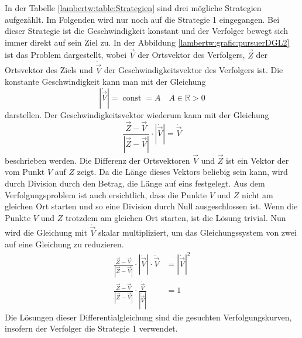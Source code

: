 In der Tabelle \eqref{lambertw:table:Strategien} sind drei mögliche Strategien aufgezählt.
Im Folgenden wird nur noch auf die Strategie 1 eingegangen.
Bei dieser Strategie ist die Geschwindigkeit konstant und der Verfolger bewegt sich immer direkt auf sein Ziel zu.
In der Abbildung \eqref{lambertw:grafic:pursuerDGL2} ist das Problem dargestellt,
wobei $\vec{V}$ der Ortsvektor des Verfolgers, $\vec{Z}$ der Ortsvektor des Ziels und $\dot{\vec{V}}$ der Geschwindigkeitsvektor des Verfolgers ist.
Die konstante Geschwindigkeit kann man mit der Gleichung
\begin{equation}
    |\dot{\vec{V}}|
    = \operatorname{const} = A
    \quad A\in\mathbb{R}>0
\end{equation}
darstellen. Der Geschwindigkeitsvektor wiederum kann mit der Gleichung
\begin{equation}
    \frac{\vec{Z}-\vec{V}}{|\vec{Z}-\vec{V}|}\cdot|\dot{\vec{V}}|
    =
    \dot{\vec{V}}
\end{equation}
beschrieben werden.
Die Differenz der Ortsvektoren $\vec{V}$ und $\vec{Z}$ ist ein Vektor der vom Punkt $V$ auf $Z$ zeigt.
Da die Länge dieses Vektors beliebig sein kann, wird durch Division durch den Betrag, die Länge auf eins festgelegt.
Aus dem Verfolgungsproblem ist auch ersichtlich, dass die Punkte $V$ und $Z$ nicht am gleichen Ort starten und so eine Division durch Null ausgeschlossen ist.
Wenn die Punkte $V$ und $Z$ trotzdem am gleichen Ort starten, ist die Lösung trivial.
Nun wird die Gleichung mit $\dot{\vec{V}}$ skalar multipliziert, um das Gleichungssystem von zwei auf eine Gleichung zu reduzieren.
\begin{align}
    \frac{\vec{Z}-\vec{V}}{|\vec{Z}-\vec{V}|}\cdot|\dot{\vec{V}}|\cdot\dot{\vec{V}}
    &=
    |\dot{\vec{V}}|^2
    \\
    \label{lambertw:pursuerDGL}
    \frac{\vec{Z}-\vec{V}}{|\vec{Z}-\vec{V}|}\cdot \frac{\dot{\vec{V}}}{|\dot{\vec{V}}|}
    &=
    1
\end{align}
Die Lösungen dieser Differentialgleichung sind die gesuchten Verfolgungskurven, insofern der Verfolger die Strategie 1 verwendet.

